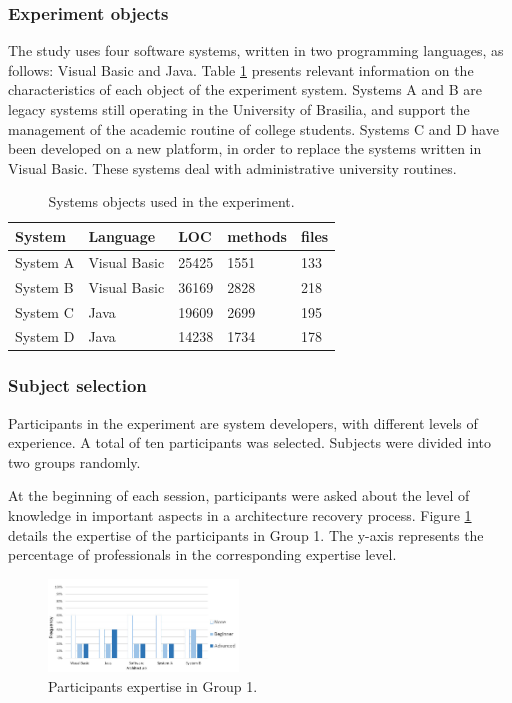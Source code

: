 \documentclass{sig-alternate-05-2015}
\begin{document}
\subsubsection{Experiment objects}%

The study uses four software systems, written in two programming languages, as follows: Visual Basic and Java. Table \ref{tabelaSistemasObjetos}  presents relevant information on the characteristics of each object of the experiment system. Systems A and B are legacy systems still operating in the University of Brasilia, and support the management of the academic routine of college students. Systems C and D have been developed on a new platform, in order to replace the systems written in Visual Basic. These systems deal with administrative university routines.

\begin{table}[h]
	\centering
	\caption{Systems objects used in the experiment.}
	\label{tabelaSistemasObjetos}
	\begin{tabular}{|lllll|}
		\hline
		System  & Language    & LOC   &  methods & files  \\ \hline
		System A             & Visual Basic & 25425 & 1551       & 133        \\
		System B           & Visual Basic & 36169 & 2828       & 218        \\
		System C            & Java         & 19609 & 2699       & 195        \\
		System D           & Java         & 14238 & 1734       & 178        \\ \hline
	\end{tabular}
\end{table}

\subsubsection{Subject selection}%
Participants in the experiment are system developers, with different levels of experience. A total of ten participants was selected. Subjects were divided into two groups randomly.

At the beginning of each session, participants were asked about the level of knowledge in important aspects in a architecture recovery process. Figure \ref {conhecimentoGrupo1} details the expertise of the participants in Group 1. The y-axis represents the percentage of professionals in the corresponding expertise level.

\begin{figure}[!h]
	\centering
	\includegraphics[width=0.45\textwidth]{6_expertise_participantes_grupo_1_en}
	\caption{Participants expertise in Group 1.}
	\label{conhecimentoGrupo1}
\end{figure}
\end{document}
